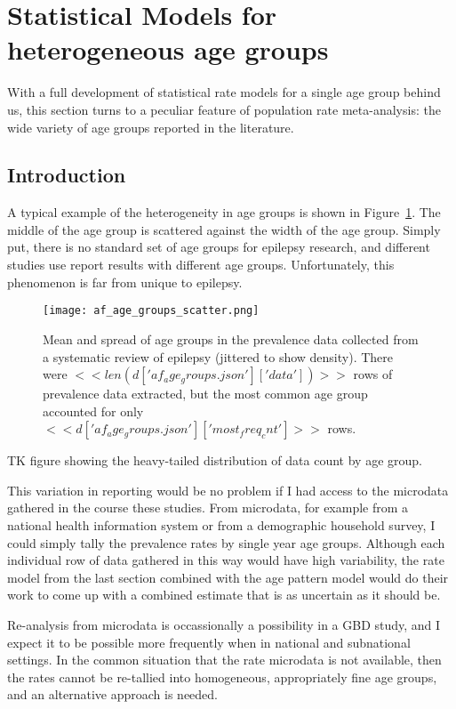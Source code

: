 \section{Statistical Models for heterogeneous age groups}
With a full development of statistical rate models for a single age
group behind us, this section turns to a peculiar feature of
population rate meta-analysis: the wide variety of age groups reported
in the literature.

\subsection{Introduction}
A typical example of the heterogeneity in age groups is shown in
Figure~\ref{theory-age_group_model-af_age_groups}.  The middle of the
age group is scattered against the width of the age group.  Simply
put, there is no standard set of age groups for epilepsy research, and
different studies use report results with different age groups.
Unfortunately, this phenomenon is far from unique to epilepsy.

\begin{figure}[h]
\begin{center}
\texttt{[image: af\_age\_groups\_scatter.png]}
\end{center}
\caption{Mean and spread of age groups in the prevalence data collected
  from a systematic review of epilepsy (jittered to show density).
  There were $<<len(d['af_age_groups.json']['data'])>>$ rows of prevalence
  data extracted, but the most common age
  group accounted for only $<<d['af_age_groups.json']['most_freq_cnt']>>$ rows.}
\label{theory-age_group_model-af_age_groups}
\end{figure}

TK figure showing the heavy-tailed distribution of data count by age group.

This variation in reporting would be no problem if I had access to the
microdata gathered in the course these studies.  From microdata, for
example from a national health information system or from a
demographic household survey, I could simply tally the prevalence
rates by single year age groups.  Although each individual row of data
gathered in this way would have high variability, the rate model from
the last section combined with the age pattern model would do their
work to come up with a combined estimate that is as uncertain as it
should be.

Re-analysis from microdata is occassionally a possibility in a GBD
study, and I expect it to be possible more frequently when in national
and subnational settings.  In the common situation
that the rate microdata is not available, then the rates cannot be
re-tallied into homogeneous, appropriately fine age groups, and an
alternative approach is needed.

